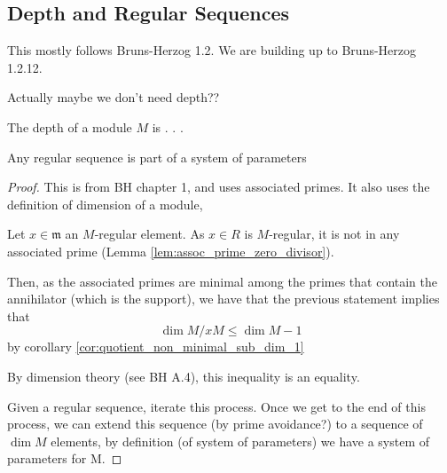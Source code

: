 \subsection{Depth and Regular Sequences}

This mostly follows Bruns-Herzog 1.2.
We are building up to Bruns-Herzog 1.2.12.

Actually maybe we don't need depth??

\begin{definition}
  \label{def:depth}
  The depth of a module $M$ is . . . 
\end{definition}

\begin{theorem}[BH 1.2.12]
  \label{thm:reg_seq_part_of_sys_param}
  Any regular sequence is part of a system of parameters
\end{theorem}

\begin{proof}

    This is 
    from BH chapter 1, and uses associated primes.
    It also uses the definition of dimension of a module,
    
    Let \(x \in \mathfrak{m}\) an \(M\)-regular element.
    As \(x \in R\) is \(M\)-regular,  
    it is not in any associated prime (Lemma \ref{lem:assoc_prime_zero_divisor}).
    
    Then, as the associated primes are minimal among the primes
    that contain the annihilator (which is the support),
    we have that the previous statement implies that
    \[
    \dim M / xM \leq \dim M - 1
    \] 
    by corollary \ref{cor:quotient_non_minimal_sub_dim_1}
    
    By dimension theory (see BH A.4), this inequality is an equality.
    
    Given a regular sequence, iterate this process. 
    Once we get to the end of this process, we can extend this sequence
    (by prime avoidance?)
    to a sequence of
    \(\dim M\) elements, by definition (of system of parameters) we have a system of
    parameters for M.

\end{proof}


